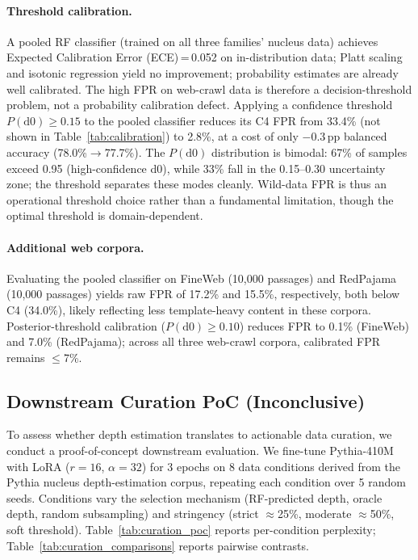 \paragraph{Threshold calibration.}
A pooled RF classifier (trained on all three families' nucleus data) achieves Expected Calibration Error (ECE)\,=\,0.052 on in-distribution data; Platt scaling and isotonic regression yield no improvement; probability estimates are already well calibrated.
The high FPR on web-crawl data is therefore a decision-threshold problem, not a probability calibration defect.
Applying a confidence threshold $P(\mathrm{d0}) \geq 0.15$ to the pooled classifier reduces its C4 FPR from 33.4\% (not shown in Table~\ref{tab:calibration}) to 2.8\%, at a cost of only $-$0.3\,pp balanced accuracy (78.0\%$\to$77.7\%).
The $P(\mathrm{d0})$ distribution is bimodal: 67\% of samples exceed 0.95 (high-confidence d0), while 33\% fall in the 0.15--0.30 uncertainty zone; the threshold separates these modes cleanly.
Wild-data FPR is thus an operational threshold choice rather than a fundamental limitation, though the optimal threshold is domain-dependent.

\paragraph{Additional web corpora.}
Evaluating the pooled classifier on FineWeb (10{,}000 passages) and RedPajama (10{,}000 passages) yields raw FPR of 17.2\% and 15.5\%, respectively, both below C4 (34.0\%), likely reflecting less template-heavy content in these corpora.
Posterior-threshold calibration ($P(\mathrm{d0}) \geq 0.10$) reduces FPR to 0.1\% (FineWeb) and 7.0\% (RedPajama); across all three web-crawl corpora, calibrated FPR remains ${\leq}$7\%.

\subsection{Downstream Curation PoC (Inconclusive)}
\label{app:curation_poc}

To assess whether depth estimation translates to actionable data curation, we conduct a proof-of-concept downstream evaluation.
We fine-tune Pythia-410M with LoRA ($r{=}16$, $\alpha{=}32$) for 3 epochs on 8 data conditions derived from the Pythia nucleus depth-estimation corpus, repeating each condition over 5 random seeds.
Conditions vary the selection mechanism (RF-predicted depth, oracle depth, random subsampling) and stringency (strict $\approx$25\%, moderate $\approx$50\%, soft threshold).
Table~\ref{tab:curation_poc} reports per-condition perplexity; Table~\ref{tab:curation_comparisons} reports pairwise contrasts.

